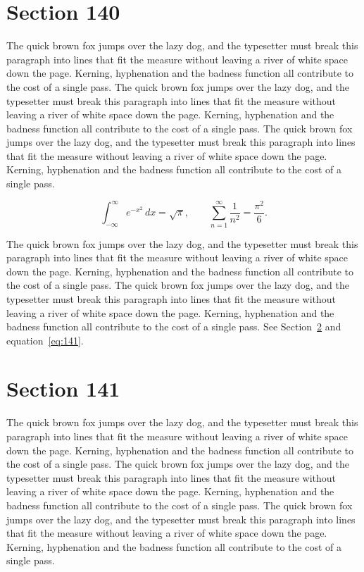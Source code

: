 \documentclass{article}
\begin{document}
\section{Section 140}
\label{sec:140}
The quick brown fox jumps over the lazy dog, and the typesetter must break this paragraph into lines that fit the measure without leaving a river of white space down the page. Kerning, hyphenation and the badness function all contribute to the cost of a single pass. The quick brown fox jumps over the lazy dog, and the typesetter must break this paragraph into lines that fit the measure without leaving a river of white space down the page. Kerning, hyphenation and the badness function all contribute to the cost of a single pass. The quick brown fox jumps over the lazy dog, and the typesetter must break this paragraph into lines that fit the measure without leaving a river of white space down the page. Kerning, hyphenation and the badness function all contribute to the cost of a single pass. 

\begin{equation}\label{eq:140}
\int_{-\infty}^{\infty} e^{-x^{2}}\,dx = \sqrt{\pi}, \qquad
\sum_{n=1}^{\infty} \frac{1}{n^{2}} = \frac{\pi^{2}}{6}.
\end{equation}

The quick brown fox jumps over the lazy dog, and the typesetter must break this paragraph into lines that fit the measure without leaving a river of white space down the page. Kerning, hyphenation and the badness function all contribute to the cost of a single pass. The quick brown fox jumps over the lazy dog, and the typesetter must break this paragraph into lines that fit the measure without leaving a river of white space down the page. Kerning, hyphenation and the badness function all contribute to the cost of a single pass. 
See Section~\ref{sec:141} and equation~\eqref{eq:141}.
\section{Section 141}
\label{sec:141}
The quick brown fox jumps over the lazy dog, and the typesetter must break this paragraph into lines that fit the measure without leaving a river of white space down the page. Kerning, hyphenation and the badness function all contribute to the cost of a single pass. The quick brown fox jumps over the lazy dog, and the typesetter must break this paragraph into lines that fit the measure without leaving a river of white space down the page. Kerning, hyphenation and the badness function all contribute to the cost of a single pass. The quick brown fox jumps over the lazy dog, and the typesetter must break this paragraph into lines that fit the measure without leaving a river of white space down the page. Kerning, hyphenation and the badness function all contribute to the cost of a single pass. 
\end{document}

